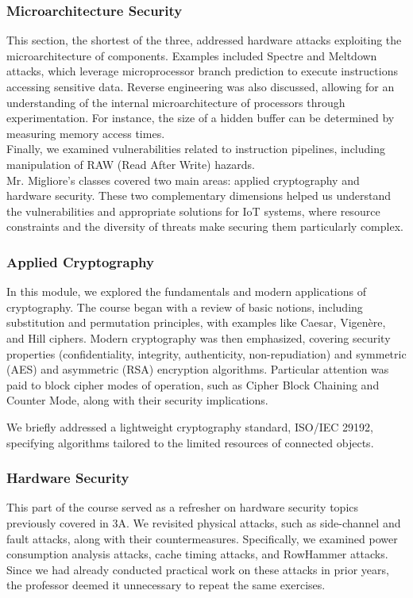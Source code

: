 \subsubsection{Microarchitecture Security}
\indent \indent This section, the shortest of the three, addressed hardware attacks exploiting the microarchitecture of components. Examples included Spectre and Meltdown attacks, which leverage microprocessor branch prediction to execute instructions accessing sensitive data. Reverse engineering was also discussed, allowing for an understanding of the internal microarchitecture of processors through experimentation. For instance, the size of a hidden buffer can be determined by measuring memory access times.\\
\noindent Finally, we examined vulnerabilities related to instruction pipelines, including manipulation of RAW (Read After Write) hazards.
\\

Mr. Migliore's classes covered two main areas: applied cryptography and hardware security. These two complementary dimensions helped us understand the vulnerabilities and appropriate solutions for IoT systems, where resource constraints and the diversity of threats make securing them particularly complex.

\subsubsection{Applied Cryptography}
\indent \indent In this module, we explored the fundamentals and modern applications of cryptography. The course began with a review of basic notions, including substitution and permutation principles, with examples like Caesar, Vigenère, and Hill ciphers. Modern cryptography was then emphasized, covering security properties (confidentiality, integrity, authenticity, non-repudiation) and symmetric (AES) and asymmetric (RSA) encryption algorithms. Particular attention was paid to block cipher modes of operation, such as Cipher Block Chaining and Counter Mode, along with their security implications.
\vspace{0.25cm}

\noindent We briefly addressed a lightweight cryptography standard, ISO/IEC 29192, specifying algorithms tailored to the limited resources of connected objects.

\subsubsection{Hardware Security}
\indent \indent This part of the course served as a refresher on hardware security topics previously covered in 3A. We revisited physical attacks, such as side-channel and fault attacks, along with their countermeasures. Specifically, we examined power consumption analysis attacks, cache timing attacks, and RowHammer attacks. Since we had already conducted practical work on these attacks in prior years, the professor deemed it unnecessary to repeat the same exercises.

